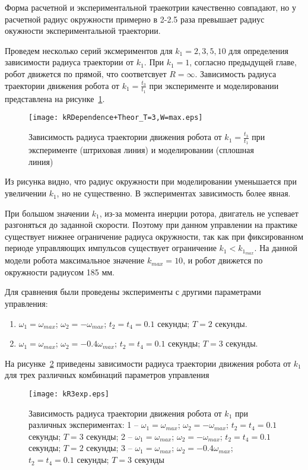Форма расчетной и экспериментальной траекотрии качественно совпадают, но у расчетной радиус окружности примерно в 2-2.5 раза превышает радиус окужности экспериментальной траектории.

Проведем несколько серий эксмериментов для $k_1 = 2, 3, 5, 10$ для определения зависимости радиуса траектории от $ k_1 $. При $k_1 = 1$, согласно предыдущей главе, робот движется по прямой, что соответсвует $ R = \infty $. Зависимость радиуса траектории движения робота от $k_1 = \frac{t_3}{t_1}$ при эксперименте и моделировании представлена на рисунке~\ref{kRDependence}.

\begin{figure}[!ht]
	\centering
	\texttt{[image: kRDependence+Theor\_T=3,W=max.eps]}
	\caption{Зависимость радиуса траектории движения робота от $k_1 = \frac{t_3}{t_1}$ при эксперименте (штриховая линия) и моделировании (сплошная линия)}
	\label{kRDependence}
\end{figure}

Из рисунка видно, что радиус окружности при моделировании уменьшается при увеличении $ k_1 $, но не существенно. В экспериментах зависимость более явная.

При большом значении $k_1$, из-за момента инерции ротора, двигатель не успевает разгоняться до заданной скорости. Поэтому при данном управлении на практике существует нижнее ограничение радиуса окружности, так как при фиксированном периоде управляющих импульсов существует ограничение $k_1 < k_{1_{max}}$. На данной модели робота максимальное значение $k_{max}=10$, и робот движется по окружности радиусом 185 мм.

Для сравнения были проведены эксперименты с другими параметрами управления:

\begin{enumerate}
	\itemsep=-2pt
	\item $\omega_1 = \omega_{max} $; $ \omega_2 = -\omega_{max} $; $ t_2=t_4=0.1 $ секунды; $ T = 2 $ секунды.
	\item $\omega_1 = \omega_{max} $; $ \omega_2 = -0.4\omega_{max} $; $ t_2=t_4=0.1 $ секунды; $ T = 3 $ секунды.
\end{enumerate}

На рисунке~\ref{kR3exp} приведены зависимости радиуса траектории движения робота от $k_1$ для трех различных комбинаций параметров управления

\begin{figure}[!ht]
	\centering
	\texttt{[image: kR3exp.eps]}
	\caption{Зависимость радиуса траектории движения робота от $k_1$ при различных экспериментах: 1 -- $\omega_1 = \omega_{max} $; $ \omega_2 = -\omega_{max} $; $ t_2=t_4=0.1 $ секунды; $ T = 3 $ секунды; 2 -- $\omega_1 = \omega_{max} $; $ \omega_2 = -\omega_{max} $; $ t_2=t_4=0.1 $ секунды; $ T = 2 $ секунды; 3 -- $\omega_1 = \omega_{max} $; $ \omega_2 = -0.4\omega_{max} $; $ t_2=t_4=0.1 $ секунды; $ T = 3 $ секунды }
	\label{kR3exp}
\end{figure}

